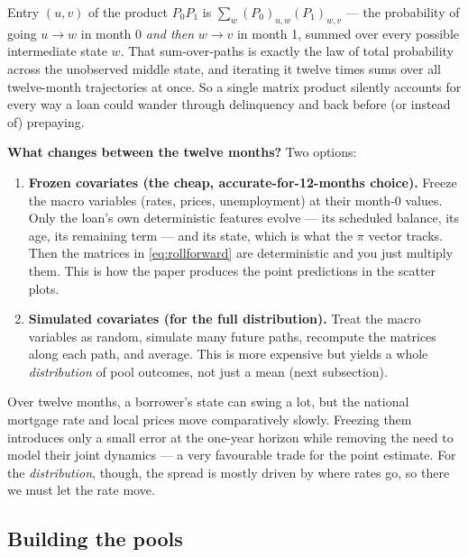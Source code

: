 \documentclass[11pt]{article}
\begin{document}
\begin{derivation}
Entry $(u,v)$ of the product $P_0 P_1$ is $\sum_{w}(P_0)_{u,w}(P_1)_{w,v}$ --- the
probability of going $u\to w$ in month 0 \emph{and then} $w\to v$ in month 1, summed over
every possible intermediate state $w$. That sum-over-paths is exactly the law of total
probability across the unobserved middle state, and iterating it twelve times sums over all
twelve-month trajectories at once. So a single matrix product silently accounts for every way
a loan could wander through delinquency and back before (or instead of) prepaying.
\end{derivation}

\textbf{What changes between the twelve months?} Two options:

\begin{enumerate}[leftmargin=1.6em, itemsep=2pt]
  \item \textbf{Frozen covariates (the cheap, accurate-for-12-months choice).} Freeze the
        macro variables (rates, prices, unemployment) at their month-0 values. Only the loan's
        own deterministic features evolve --- its scheduled balance, its age, its remaining
        term --- and its state, which is what the $\pi$ vector tracks. Then the matrices in
        \eqref{eq:rollforward} are deterministic and you just multiply them. This is how the
        paper produces the point predictions in the scatter plots.
  \item \textbf{Simulated covariates (for the full distribution).} Treat the macro variables
        as random, simulate many future paths, recompute the matrices along each path, and
        average. This is more expensive but yields a whole \emph{distribution} of pool
        outcomes, not just a mean (next subsection).
\end{enumerate}

\begin{intuition}
Over twelve months, a borrower's state can swing a lot, but the national mortgage rate and
local prices move comparatively slowly. Freezing them introduces only a small error at the
one-year horizon while removing the need to model their joint dynamics --- a very favourable
trade for the point estimate. For the \emph{distribution}, though, the spread is mostly driven
by where rates go, so there we must let the rate move.
\end{intuition}

\subsection{Building the pools}
\end{document}
